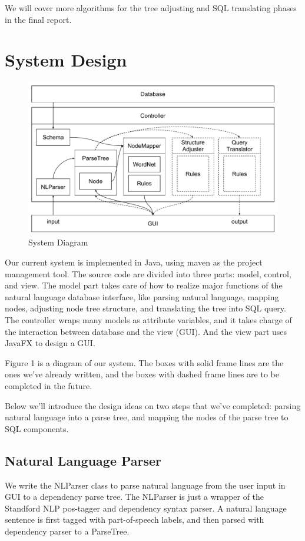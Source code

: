 \documentclass[twocolumn]{article}
\begin{document}
We will cover more algorithms for the tree adjusting and SQL translating phases in the final report.  

\section{System Design}

\begin{figure}[ht]
  \centering
  \includegraphics[width=0.8\linewidth]{figures/nlidb_system_diagram.pdf}
  \caption{System Diagram}
\end{figure}

Our current system is implemented in Java, using maven as the project management tool. The source code are divided into three parts: model, control, and view. The model part takes care of how to realize major functions of the natural language database interface, like parsing natural language, mapping nodes, adjusting node tree structure, and translating the tree into SQL query. The controller wraps many models as attribute variables, and it takes charge of the interaction between database and the view (GUI). And the view part uses JavaFX to design a GUI.

Figure 1 is a diagram of our system. The boxes with solid frame lines are the ones we've already written, and the boxes with dashed frame lines are to be completed in the future. 

Below we’ll introduce the design ideas on two steps that we’ve completed: parsing natural language into a parse tree, and mapping the nodes of the parse tree to SQL components.

\subsection{Natural Language Parser}
We write the NLParser class to parse natural language from the user input in GUI to a dependency parse tree. The NLParser is just a wrapper of the Standford NLP pos-tagger and dependency syntax parser. A natural language sentence is first tagged with part-of-speech labels, and then parsed with dependency parser to a ParseTree.
\end{document}
